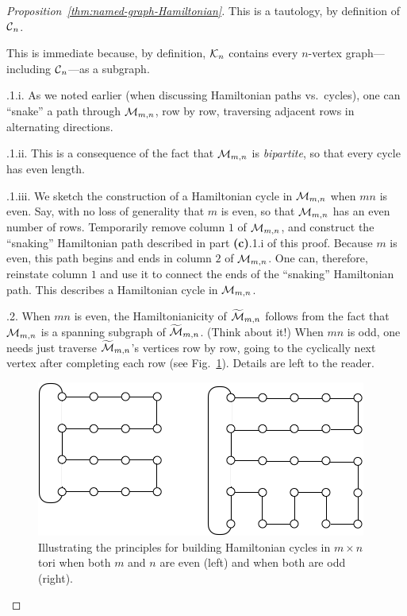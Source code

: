 \begin{proof}[Proposition~\ref{thm:named-graph-Hamiltonian}]
This is a tautology, by definition of $\mbox{$\cal C$}_n$.

\medskip

This is immediate because, by definition, $\mbox{$\cal K$}_n$ contains every $n$-vertex graph---including $\mbox{$\cal C$}_n$---as a subgraph.

\medskip

.1.i.
As we noted earlier (when discussing Hamiltonian paths vs.~cycles), one can ``snake'' a path through $\mbox{$\cal M$}_{m,n}$, row by row, traversing adjacent rows in alternating directions.

\smallskip


.1.ii.
This is a consequence of the fact that $\mbox{$\cal M$}_{m,n}$ is {\it bipartite}, so that every cycle has even length.

\smallskip

.1.iii.
We sketch the construction of a Hamiltonian cycle in $\mbox{$\cal M$}_{m,n}$ when $mn$ is even.  Say, with no loss of generality that $m$ is even, so that $\mbox{$\cal M$}_{m,n}$ has an even number of rows.  Temporarily remove column $1$ of $\mbox{$\cal M$}_{m,n}$, and construct the ``snaking'' Hamiltonian path described in part {\bf (c)}.1.i of this proof.  Because $m$ is even, this path begins and ends in column $2$ of $\mbox{$\cal M$}_{m,n}$.  One can, therefore, reinstate column $1$ and use it to connect the ends of the ``snaking'' Hamiltonian path.  This describes a Hamiltonian cycle in $\mbox{$\cal M$}_{m,n}$.

\smallskip

.2.
When $mn$ is even, the Hamiltonianicity of $\widetilde{\mbox{$\cal M$}}_{m,n}$ follows from the fact that $\mbox{$\cal M$}_{m,n}$ is a spanning subgraph of $\widetilde{\mbox{$\cal M$}}_{m,n}$.  (Think about it!)  When $mn$ is odd, one needs just traverse $\widetilde{\mbox{$\cal M$}}_{m,n}$'s vertices row by row, going to the cyclically next vertex after completing each row (see Fig.~\ref{fig:HamiltonTorus}).  Details are left to the reader.
\begin{figure}[hbt]
\begin{center}
       \includegraphics[scale=0.45]{FiguresGraph/HamiltonTorus}
\caption{Illustrating the principles for building Hamiltonian cycles in $m \times n$ tori when both $m$ and $n$ are even (left) and when both are odd (right).}
  \label{fig:HamiltonTorus}
\end{center}
\end{figure}


\end{proof}
